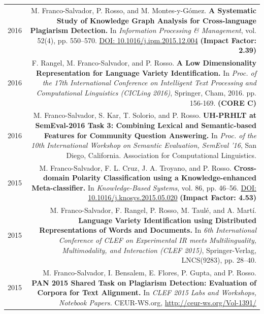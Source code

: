 \documentclass[10pt]{article}
\begin{document}
\section*{}
\begin{tabular}{L!{\VRule}R}
	2016&M. Franco-Salvador, P. Rosso, and M. Montes-y-G{\'o}mez. \textbf{A Systematic Study of Knowledge Graph Analysis for Cross-language Plagiarism Detection.}
	In \emph{Information Processing \& Management}, vol. 52(4), pp. 550--570. \href{http://dx.doi.org/10.1016/j.ipm.2015.12.004}{DOI: 10.1016/j.ipm.2015.12.004} \textbf{(Impact Factor: 2.39)} \vspace{5pt}\\
	2016 &F. Rangel, M. Franco-Salvador, and P. Rosso. \textbf{A Low Dimensionality Representation for Language Variety Identification.} In \emph{Proc.  of  the  17th  International Conference on Intelligent Text Processing and Computational Linguistics (CICLing 2016)}, Springer, Cham, 2016. pp. 156-169. \textbf{(CORE C)} \vspace{5pt}\\
	2016 &M. Franco-Salvador, S. Kar, T. Solorio, and P. Rosso. \textbf{UH-PRHLT at SemEval-2016 Task 3: Combining Lexical and Semantic-based Features for Community Question Answering.} In \emph{Proc. of the 10th International Workshop on Semantic Evaluation, SemEval '16}, San Diego, California. Association for Computational Linguistics. \vspace{5pt}\\
    2015&M. Franco-Salvador, F. L. Cruz, J. A. Troyano, and P. Rosso. \textbf{Cross-domain Polarity Classification using a Knowledge-enhanced Meta-classifier.}	
	In \emph{Knowledge-Based Systems}, vol. 86, pp. 46--56. \href{http://dx.doi.org/10.1016/j.knosys.2015.05.020}{DOI: 10.1016/j.knosys.2015.05.020} \textbf{(Impact Factor: 4.53)} \vspace{5pt}\\
	2015&M. Franco-Salvador, F. Rangel, P. Rosso, M. Taul{\'e}, and A. Mart{\'i}. \textbf{Language Variety Identification using Distributed Representations of Words and Documents.}
	In \emph{6th International Conference of CLEF on Experimental IR meets Multilinguality, Multimodality, and Interaction (CLEF 2015)}, Springer-Verlag, LNCS(9283), pp. 28--40. \vspace{5pt}\\
	2015&M. Franco-Salvador, I. Bensalem, E. Flores, P. Gupta, and P. Rosso. \textbf{PAN 2015 Shared Task on Plagiarism Detection: Evaluation of Corpora for Text Alignment.}
	In \emph{CLEF 2015 Labs and Workshops, Notebook Papers.} CEUR-WS.org, \href{http://ceur-ws.org/Vol-1391/}{http://ceur-ws.org/Vol-1391/} \vspace{5pt}\\

\end{tabular}
\end{document}
